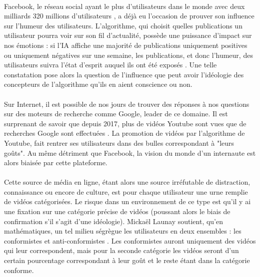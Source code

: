 \documentclass[10pt, french, a4paper]{article}
\begin{document}
\paragraph{}
Facebook, le réseau social ayant le plus d’utilisateurs dans le monde avec deux milliards 320 millions d’utilisateurs \citep{clement_global_2019}, a déjà eu l’occasion de prouver son influence sur l’humeur des utilisateurs. L’algorithme, qui choisit quelles publications un utilisateur pourra voir sur son fil d’actualité, possède une puissance d’impact sur nos émotions : si l’IA affiche une majorité de publications uniquement positives ou uniquement négatives sur une semaine, les publications, et donc l’humeur, des utilisateurs suivra l’état d’esprit auquel ils ont été exposés \citep{kramer_correction_2014}. Une telle constatation pose alors la question de l’influence que peut avoir l’idéologie des concepteurs de l’algorithme qu’ils en aient conscience ou non.

\paragraph{}
Sur Internet, il est possible de nos jours de trouver des réponses à nos questions sur des moteurs de recherche comme Google, leader de ce domaine. Il est surprenant de savoir que depuis 2017, plus de vidéos Youtube sont vues que de recherches Google sont effectuées \citep{desjardins_infographic:_2018}. La promotion de vidéos par l’algorithme de Youtube, fait rentrer ses utilisateurs dans des bulles correspondant à "leurs goûts". Au même détriment que Facebook, la vision du monde d’un internaute est alors biaisée par cette plateforme.

\paragraph{}
Cette source de média en ligne, étant alors une source irréfutable de distraction, connaissance ou encore de culture, est pour chaque utilisateur une urne remplie de vidéos catégorisées. Le risque dans un environnement de ce type est qu’il y ai une fixation sur une catégorie précise de vidéos (poussant alors le biais de confirmation s’il s’agit d’une idéologie). Mickaël Launay soutient, qu’en mathématiques, un tel milieu ségrègue les utilisateurs en deux ensembles : les conformistes et anti-conformistes \citep{launay_urnes_2012}. Les conformistes auront uniquement des vidéos qui leur correspondent, mais pour la seconde catégorie les vidéos seront d’un certain pourcentage correspondant à leur goût et le reste étant dans la catégorie conforme.
\end{document}

